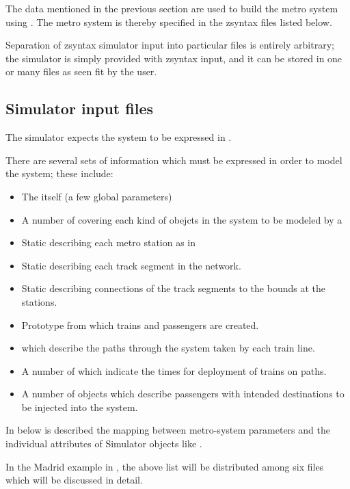 The data mentioned in the previous section are used to build the metro system using .
The metro system is thereby specified in the zsyntax files listed below.

Separation of zsyntax simulator input into particular files is entirely arbitrary;
the simulator is simply provided with zsyntax input, and it can be stored in one or
many files as seen fit by the user. 

\subsection{Simulator input files}

The simulator expects the system to be expressed in .

There are several sets of information which must be expressed in order
to model the system; these include:
\begin{itemize}
\item The  itself (a few global parameters)
\item A number of  covering each kind of obejcts in the system to be modeled by a 
\item Static  describing each metro station as in 
\item Static  describing each track segment in the network.
\item Static  describing connections of the track segments to the bounds at the stations.
\item Prototype  from which trains and passengers are created.
\item {} which describe the paths through the system taken by each train line.
\item A number of  which indicate the times for deployment of trains on paths.
\item A number of  objects which describe passengers with intended destinations to be injected into the system.
\end{itemize}

In  below is described the mapping between metro-system parameters and the
individual attributes of Simulator objects like .

In the Madrid example in , the above list will be distributed among
six files which will be discussed in detail.

